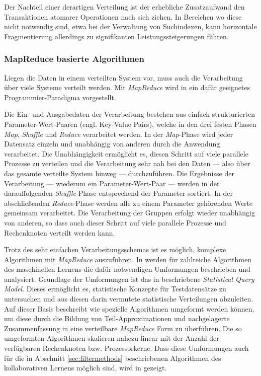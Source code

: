 Der Nachteil einer derartigen Verteilung ist der erhebliche Zusatzaufwand den Transaktionen atomarer Operationen nach sich ziehen. In Bereichen wo diese nicht notwendig sind, etwa bei der Verwaltung von Suchindexen, kann horizontale Fragmentierung allerdings zu signifikanten Leistungssteigerungen führen. \citep{Michael07}

\subsubsection{MapReduce basierte Algorithmen}\label{sec:mapred}

Liegen die Daten in einem verteilten System vor, muss auch die Verarbeitung über viele Systeme verteilt werden. Mit \textit{MapReduce} wird in \citep{mapred04} ein dafür geeignetes Programmier-Paradigma vorgestellt. 

 Die Ein- und Ausgabedaten der Verarbeitung bestehen aus einfach strukturierten Parameter-Wert-Paaren (engl. Key-Value Pairs), welche in den drei festen Phasen \textit{Map}, \textit{Shuffle} und \textit{Reduce} verarbeitet werden. In der \textit{Map}-Phase wird jeder Datensatz einzeln und unabhängig von anderen durch die Anwendung verarbeitet. Die Unabhängigkeit ermöglicht es, diesen Schritt auf viele parallele Prozesse zu verteilen und die Verarbeitung sehr nah bei den Daten --- also über das gesamte verteilte System hinweg --- durchzuführen. Die Ergebnisse der Verarbeitung --- wiederum ein Parameter-Wert-Paar --- werden in der darauffolgenden  \textit{Shuffle}-Phase entsprechend der Parameter sortiert. In der abschließenden  \textit{Reduce}-Phase werden alle zu einem Parameter gehörenden Werte gemeinsam verarbeitet. Die Verarbeitung der Gruppen erfolgt wieder unabhängig von anderen, so dass auch dieser Schritt auf viele parallele Prozesse und Rechenknoten verteilt werden kann. \citep{mapred04} %

Trotz des sehr einfachen Verarbeitungsschemas ist es möglich, komplexe Algorithmen mit \textit{MapReduce} auszuführen. In \citep{mapred06} werden für zahlreiche Algorithmen des maschinellen Lernens die dafür notwendigen Umformungen beschrieben und analysiert. Grundlage der Umformungen ist das in \citep{Kearns98} beschriebene \textit{Statistical Query Model}. Dieses ermöglicht es, statistische Konzepte für Testdatensätze zu untersuchen und aus diesen darin vermutete statistische Verteilungen abzuleiten. Auf dieser Basis beschreibt \citep{mapred06} wie spezielle Algorithmen umgeformt werden können, um diese durch die Bildung von Teil-Approximationen und nachgelagerte Zusammenfassung in eine verteilbare \textit{MapReduce} Form zu überführen. Die so umgeformten Algorithmen skalieren nahezu linear mit der Anzahl der verfügbaren Rechenknoten bzw. Prozessorkerne. Dass diese Umformungen auch für die in Abschnitt \ref{sec:filtermethods}  beschriebenen Algorithmen des kollaborativen Lernens möglich sind, wird in \citep{jiang11} gezeigt. \citep{mapred06} %

